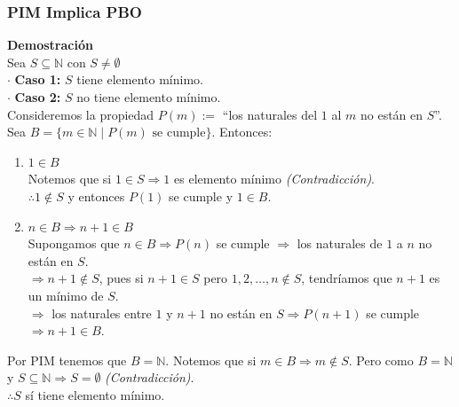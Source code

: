 \documentclass{article}
\begin{document}
\subsubsection{PIM Implica PBO}
\label{sec:pim_implica_pbo}

\noindent \textbf{Demostración} \\
\noindent Sea $S \subseteq \mathbb{N}$ con $S \neq \emptyset$ \\
\indent $\cdot$ \textbf{Caso 1:} $S$ tiene elemento mínimo. \\
\indent $\cdot$ \textbf{Caso 2:} $S$ no tiene elemento mínimo. \\
\noindent Consideremos la propiedad $P(m) :=$ ``los naturales del $1$ al $m$ no están en $S$''. \\
\noindent Sea $B = \{m \in \mathbb{N} \mid P(m) \text{ se cumple}\}$. Entonces:

\begin{enumerate}
    \item \textbf{$1 \in B$} \\
    Notemos que si $1 \in S \Rightarrow 1$ es elemento mínimo \textit{(Contradicción)}. \\
    $\therefore 1 \notin S$ y entonces $P(1)$ se cumple y $1 \in B$.
    \item \textbf{$n \in B \Rightarrow n+1 \in B$} \\
    Supongamos que $n \in B \Rightarrow P(n)$ se cumple $\Rightarrow$ los naturales de $1$ a $n$ no están en $S$. \\
    $\Rightarrow n+1 \notin S$, pues si $n+1 \in S$ pero $1, 2, \dots, n \notin S$, tendríamos que $n+1$ es un mínimo de $S$. \\
    $\Rightarrow$ los naturales entre $1$ y $n+1$ no están en $S \Rightarrow P(n+1)$ se cumple $\Rightarrow n+1 \in B$.
\end{enumerate}

\noindent Por PIM tenemos que $B = \mathbb{N}$. Notemos que si $m \in B \Rightarrow m \notin S$. Pero como $B = \mathbb{N}$ y $S \subseteq \mathbb{N} \Rightarrow S = \emptyset$ \textit{(Contradicción)}. \\
\noindent $\therefore S$ sí tiene elemento mínimo. 
\end{document}
